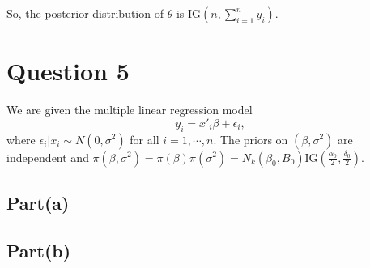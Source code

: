 \documentclass[a4paper]{article}
\begin{document}
So, the posterior distribution of \(\theta\) is \(\text{IG}(n,\sum_{i=1}^{n}y_i)\).

\newpage

\section*{Question 5}
We are given the multiple linear regression model
\[y_i = x'_i\beta + \epsilon_i,\] 
where \(\epsilon_i|x_i\sim N(0,\sigma^2)\) for all \(i=1,\cdots,n\). The priors on \((\beta,\sigma^2)\) are independent and \(\pi(\beta, \sigma^2) = \pi(\beta)\pi(\sigma^2) = N_k(\beta_0,B_0)\text{IG}(\frac{\alpha_0}{2},\frac{\delta_0}{2})\).

\subsection*{Part(a)}


\subsection*{Part(b)}
\end{document}

